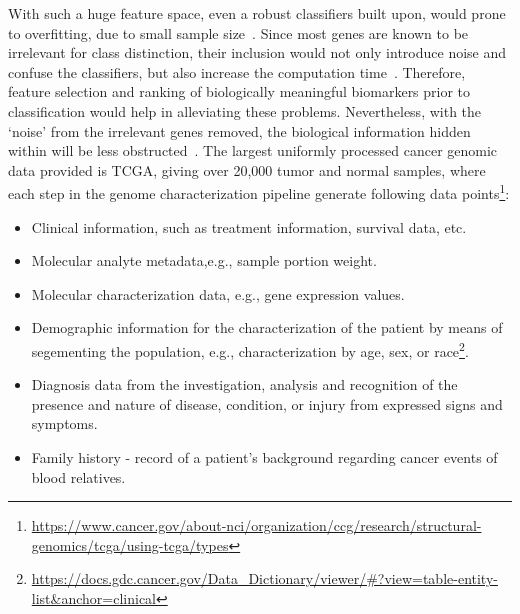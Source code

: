 \hspace*{3.5mm} With such a huge feature space, even a robust classifiers built upon, would prone to overfitting, due to small sample size~\cite{lu2003cancer}. Since most genes are known to be irrelevant for class distinction, their inclusion would not only introduce noise and confuse the classifiers, but also increase the computation time~\cite{lu2003cancer}. Therefore, feature selection and ranking of biologically meaningful biomarkers prior to classification would help in alleviating these problems. Nevertheless, with the `noise' from the irrelevant genes removed, the biological information hidden within will be less  obstructed~\cite{lu2003cancer}. 
The largest uniformly processed cancer genomic data provided is TCGA, giving over 20,000 tumor and normal samples, where each step in the genome characterization pipeline generate following data points\footnote{\url{https://www.cancer.gov/about-nci/organization/ccg/research/structural-genomics/tcga/using-tcga/types}}:

\begin{itemize}[noitemsep]
    \item Clinical information, such as treatment information, survival data, etc. 
    \item Molecular analyte metadata,e.g., sample portion weight.
    \item Molecular characterization data, e.g., gene expression values.
    \item Demographic information for the characterization of the patient by means of segementing the population, e.g., characterization by age, sex, or race\footnote{\url{https://docs.gdc.cancer.gov/Data_Dictionary/viewer/\#?view=table-entity-list&anchor=clinical}}.
    \item Diagnosis data from the investigation, analysis and recognition of the presence and nature of disease, condition, or injury from expressed signs and symptoms. 
    \item Family history - record of a patient's background regarding cancer events of blood relatives.
\end{itemize}

